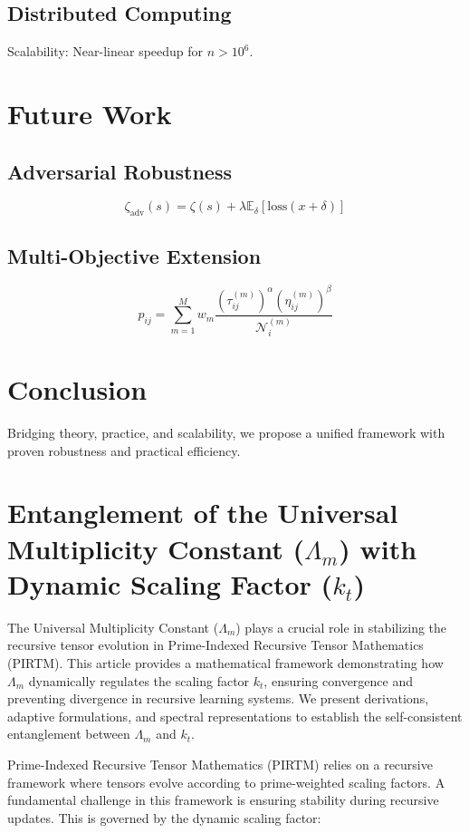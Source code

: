 \documentclass{article}
\theoremstyle{plain}
\begin{document}
\subsection{Distributed Computing}
Scalability: Near-linear speedup for \(n > 10^6\).

\section{Future Work}

\subsection{Adversarial Robustness}
\[
\zeta_{\text{adv}}(s) = \zeta(s) + \lambda \mathbb{E}_\delta[\text{loss}(x + \delta)]
\]

\subsection{Multi-Objective Extension}
\[
p_{ij} = \sum_{m=1}^M w_m \frac{(\tau_{ij}^{(m)})^\alpha (\eta_{ij}^{(m)})^\beta}{\mathcal{N}_i^{(m)}}
\]

\section{Conclusion}
Bridging theory, practice, and scalability, we propose a unified framework with proven robustness and practical efficiency.
\section{Entanglement of the Universal Multiplicity Constant ($\Lambda_m$) with Dynamic Scaling Factor ($k_t$)}

The Universal Multiplicity Constant ($\Lambda_m$) plays a crucial role in stabilizing the recursive tensor evolution in Prime-Indexed Recursive Tensor Mathematics (PIRTM). This article provides a mathematical framework demonstrating how $\Lambda_m$ dynamically regulates the scaling factor $k_t$, ensuring convergence and preventing divergence in recursive learning systems. We present derivations, adaptive formulations, and spectral representations to establish the self-consistent entanglement between $\Lambda_m$ and $k_t$.

Prime-Indexed Recursive Tensor Mathematics (PIRTM) relies on a recursive framework where tensors evolve according to prime-weighted scaling factors. A fundamental challenge in this framework is ensuring stability during recursive updates. This is governed by the dynamic scaling factor:
\end{document}
